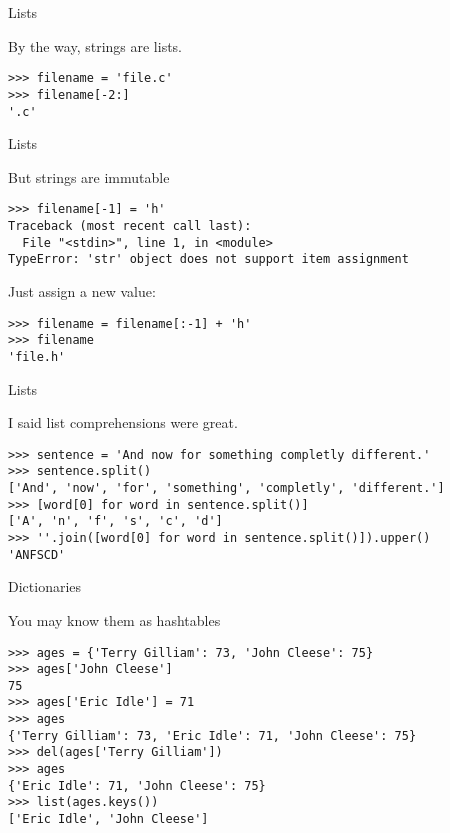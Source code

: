\documentclass[ignorenonframetext,]{beamer}
\begin{document}
\begin{frame}[fragile]{Lists}

    By the way, strings are lists.

    \begin{verbatim}
>>> filename = 'file.c'
>>> filename[-2:]
'.c'
    \end{verbatim}
\end{frame}

\begin{frame}[fragile]{Lists}

    But strings are immutable

    \begin{verbatim}
>>> filename[-1] = 'h'
Traceback (most recent call last):
  File "<stdin>", line 1, in <module>
TypeError: 'str' object does not support item assignment
    \end{verbatim}

    \pause
    Just assign a new value:
    \begin{verbatim}
>>> filename = filename[:-1] + 'h'
>>> filename
'file.h'
    \end{verbatim}
\end{frame}

\begin{frame}[fragile]{Lists}

    I said list comprehensions were great.

    \begin{verbatim}
>>> sentence = 'And now for something completly different.'
>>> sentence.split()
['And', 'now', 'for', 'something', 'completly', 'different.']
>>> [word[0] for word in sentence.split()]
['A', 'n', 'f', 's', 'c', 'd']
>>> ''.join([word[0] for word in sentence.split()]).upper()
'ANFSCD'
    \end{verbatim}
\end{frame}

\begin{frame}[fragile]{Dictionaries}

    You may know them as hashtables

    \begin{verbatim}
>>> ages = {'Terry Gilliam': 73, 'John Cleese': 75}
>>> ages['John Cleese']
75
>>> ages['Eric Idle'] = 71
>>> ages
{'Terry Gilliam': 73, 'Eric Idle': 71, 'John Cleese': 75}
>>> del(ages['Terry Gilliam'])
>>> ages
{'Eric Idle': 71, 'John Cleese': 75}
>>> list(ages.keys())
['Eric Idle', 'John Cleese']
    \end{verbatim}
\end{frame}
\end{document}
